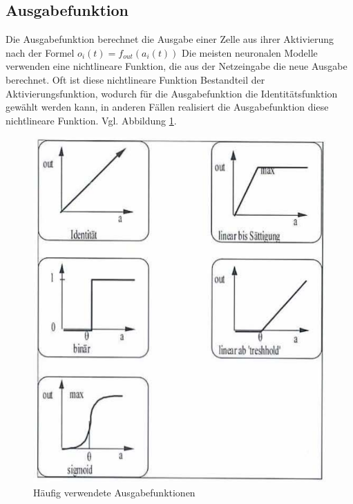 \subsection{Ausgabefunktion}
Die Ausgabefunktion berechnet die Ausgabe einer Zelle aus ihrer Aktivierung nach
der Formel $o_i(t) = f_{out}(a_i(t))$
Die meisten neuronalen Modelle verwenden eine nichtlineare Funktion, die aus der
Netzeingabe die neue Ausgabe berechnet. Oft ist diese nichtlineare Funktion
Bestandteil der Aktivierungsfunktion, wodurch für die Ausgabefunktion die
Identitätsfunktion gewählt werden kann, in anderen Fällen realisiert die
Ausgabefunktion diese nichtlineare Funktion. Vgl. Abbildung \ref{fig:ausgabefunktionen}.
\begin{figure}[ht!] \centering 
	\includegraphics[width=\linewidth]{figures/ch01_Ausgabefunktion.png}
	\caption{Häufig verwendete Ausgabefunktionen}
	\label{fig:ausgabefunktionen}
\end{figure}

